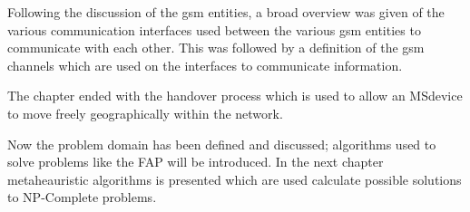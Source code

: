 Following the discussion of the \gls{gsm} entities, a broad overview was given of the various communication interfaces used between the various \gls{gsm} entities to communicate with each other. This was followed by a definition of the \gls{gsm} channels which are used on the interfaces to communicate information.

The chapter ended with the handover process which is used to allow an \gls{MS}device to move freely geographically within the network. 

Now the problem domain has been defined and discussed; algorithms used to solve problems like the \gls{FAP} will be introduced. In the next chapter metaheauristic algorithms is presented which are used calculate possible solutions to NP-Complete problems.
